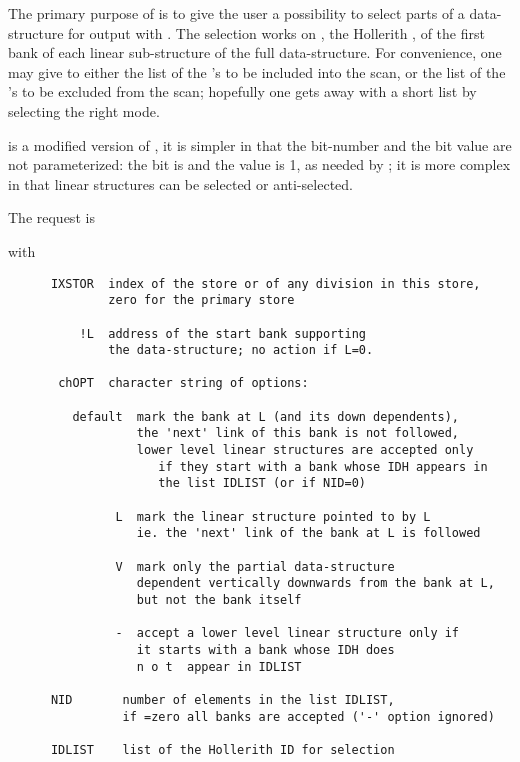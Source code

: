 The primary purpose of  is to give the user a possibility
to select parts of a data-structure for output with .
The selection works on , the Hollerith , of the first bank
of each linear sub-structure of the full data-structure.
For convenience,
one may give to  either the list of the 's to be included
into the scan, or the list of the 's to be excluded from the scan;
hopefully one gets away with a short list by selecting the right
mode.

 is a modified version of , it is simpler in that
the bit-number and the bit value are not parameterized:
the bit is  and the value is 1, as needed by ;
it is more complex in that linear structures can be selected
or anti-selected.

The request is


with
\begin{verbatim}
      IXSTOR  index of the store or of any division in this store,
              zero for the primary store

          !L  address of the start bank supporting
              the data-structure; no action if L=0.

       chOPT  character string of options:

         default  mark the bank at L (and its down dependents),
                  the 'next' link of this bank is not followed,
                  lower level linear structures are accepted only
                     if they start with a bank whose IDH appears in
                     the list IDLIST (or if NID=0)

               L  mark the linear structure pointed to by L
                  ie. the 'next' link of the bank at L is followed

               V  mark only the partial data-structure
                  dependent vertically downwards from the bank at L,
                  but not the bank itself

               -  accept a lower level linear structure only if
                  it starts with a bank whose IDH does
                  n o t  appear in IDLIST

      NID       number of elements in the list IDLIST,
                if =zero all banks are accepted ('-' option ignored)

      IDLIST    list of the Hollerith ID for selection
\end{verbatim} 


